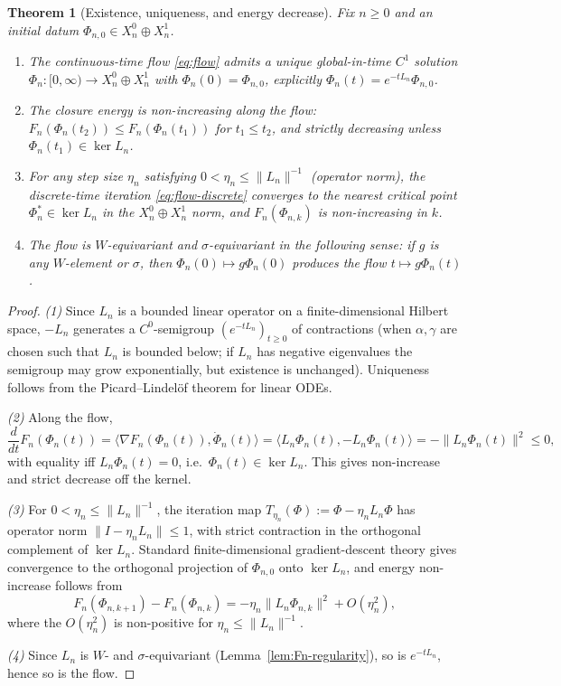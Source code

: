 \documentclass[11pt, a4paper]{amsart}
\newtheorem{theorem}{Theorem}[section]
\theoremstyle{definition}
\begin{document}
\begin{theorem}[Existence, uniqueness, and energy decrease]
\label{thm:flow-exists}
Fix $n \geq 0$ and an initial datum $\Phi_{n, 0} \in X_n^0 \oplus
X_n^1$.
\begin{enumerate}
\item The continuous-time flow \eqref{eq:flow} admits a unique
  global-in-time $C^1$ solution $\Phi_n \colon [0, \infty) \to X_n^0
  \oplus X_n^1$ with $\Phi_n(0) = \Phi_{n, 0}$, explicitly
  $\Phi_n(t) = e^{-t L_n} \Phi_{n, 0}$.
\item The closure energy is non-increasing along the flow:
  $F_n(\Phi_n(t_2)) \leq F_n(\Phi_n(t_1))$ for $t_1 \leq t_2$, and
  strictly decreasing unless $\Phi_n(t_1) \in \ker L_n$.
\item For any step size $\eta_n$ satisfying
  $0 < \eta_n \leq \|L_n\|^{-1}$ (operator norm), the discrete-time
  iteration \eqref{eq:flow-discrete} converges to the nearest
  critical point $\Phi_n^* \in \ker L_n$ in the $X_n^0 \oplus
  X_n^1$ norm, and $F_n(\Phi_{n, k})$ is non-increasing in $k$.
\item The flow is $W$-equivariant and $\sigma$-equivariant in the
  following sense: if $g$ is any $W$-element or $\sigma$, then
  $\Phi_n(0) \mapsto g\Phi_n(0)$ produces the flow
  $t \mapsto g\Phi_n(t)$.
\end{enumerate}
\end{theorem}

\begin{proof}
\emph{(1)} Since $L_n$ is a bounded linear operator on a
finite-dimensional Hilbert space, $-L_n$ generates a $C^0$-semigroup
$(e^{-tL_n})_{t \geq 0}$ of contractions (when
$\alpha, \gamma$ are chosen such that $L_n$ is bounded below; if
$L_n$ has negative eigenvalues the semigroup may grow exponentially,
but existence is unchanged). Uniqueness follows from the
Picard--Lindel\"of theorem for linear ODEs.

\emph{(2)} Along the flow,
\[
  \frac{d}{dt} F_n(\Phi_n(t))
  = \langle \nabla F_n(\Phi_n(t)), \dot\Phi_n(t) \rangle
  = \langle L_n \Phi_n(t), -L_n \Phi_n(t) \rangle
  = -\|L_n \Phi_n(t)\|^2 \leq 0,
\]
with equality iff $L_n \Phi_n(t) = 0$, i.e.\ $\Phi_n(t) \in \ker
L_n$. This gives non-increase and strict decrease off the kernel.

\emph{(3)} For $0 < \eta_n \leq \|L_n\|^{-1}$, the iteration map
$T_{\eta_n}(\Phi) := \Phi - \eta_n L_n \Phi$ has operator norm
$\|I - \eta_n L_n\| \leq 1$, with strict contraction in the
orthogonal complement of $\ker L_n$. Standard finite-dimensional
gradient-descent theory gives convergence to the orthogonal
projection of $\Phi_{n, 0}$ onto $\ker L_n$, and energy
non-increase follows from
\[
  F_n(\Phi_{n, k+1}) - F_n(\Phi_{n, k}) = -\eta_n \|L_n
    \Phi_{n, k}\|^2 + O(\eta_n^2),
\]
where the $O(\eta_n^2)$ is non-positive for $\eta_n \leq
\|L_n\|^{-1}$.

\emph{(4)} Since $L_n$ is $W$- and $\sigma$-equivariant
(Lemma~\ref{lem:Fn-regularity}), so is $e^{-t L_n}$, hence so is
the flow.
\end{proof}
\end{document}
